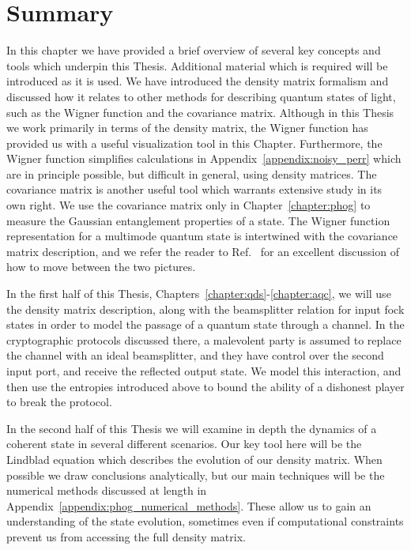 \FloatBarrier
\section{Summary}



In this chapter we have provided a brief overview of several key concepts and tools which underpin this Thesis. Additional material which is required will be introduced as it is used. We have introduced the density matrix formalism and discussed how it relates to other methods for describing quantum states of light, such as the Wigner function and the covariance matrix. Although in this Thesis we work primarily in terms of the density matrix, the Wigner function has provided us with a useful visualization tool in this Chapter. Furthermore, the Wigner function simplifies calculations in Appendix~\ref{appendix:noisy_perr} which are in principle possible, but difficult in general, using density matrices. The covariance matrix is another useful tool which warrants extensive study in its own right. We use the covariance matrix only in Chapter~\ref{chapter:phog} to measure the Gaussian entanglement properties of a state. The Wigner function representation for a multimode quantum state is intertwined with the covariance matrix description, and we refer the reader to Ref.~\cite{Serafini2017} for an excellent discussion of how to move between the two pictures.

In the first half of this Thesis, Chapters~\ref{chapter:qds}-\ref{chapter:aqc}, we will use the density matrix description, along with the beamsplitter relation for input fock states in order to model the passage of a quantum state through a channel. In the cryptographic protocols discussed there, a malevolent party is assumed to replace the channel with an ideal beamsplitter, and they have control over the second input port, and receive the reflected output state. We model this interaction, and then use the entropies introduced above to bound the ability of a dishonest player to break the protocol.

In the second half of this Thesis we will examine in depth the dynamics of a coherent state in several different scenarios. Our key tool here will be the Lindblad equation which describes the evolution of our density matrix. When possible we draw conclusions analytically, but our main techniques will be the numerical methods discussed at length in Appendix~\ref{appendix:phog_numerical_methods}. These allow us to gain an understanding of the state evolution, sometimes even if computational constraints prevent us from accessing the full density matrix. 







